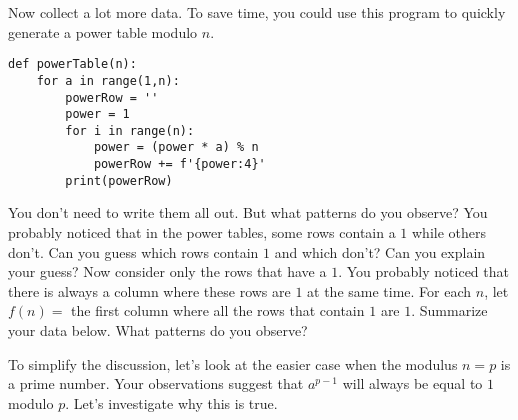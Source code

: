 \documentclass[12pt]{exam}
\newcommand{\Z}{\mathbb Z}
\begin{document}
\begin{questions}
\begin{center}
  \end{center}
  \newpage
  \question Now collect a lot more data. To save time, you could use this program to quickly generate a power table modulo $n$.
  \begin{lstlisting}
def powerTable(n):
    for a in range(1,n):
        powerRow = ''
        power = 1
        for i in range(n):
            power = (power * a) % n
            powerRow += f'{power:4}'
        print(powerRow)
  \end{lstlisting}
  You don't need to write them all out. But what patterns do you observe?
  \newpage
  \question You probably noticed that in the power tables, some rows contain a $1$ while others don't. Can you guess which rows contain $1$ and which don't? Can you explain your guess?
  \vspace{2in}
  \question Now consider only the rows that have a $1$. You probably noticed that there is always a column where these rows are $1$ at the same time. For each $n$, let $f(n)=$ the first column where all the rows that contain $1$ are $1$. Summarize your data below. What patterns do you observe?
  \begin{center}
  \end{center}
  \newpage
  \question To simplify the discussion, let's look at the easier case when the modulus $n=p$ is a prime number. Your observations suggest that $a^{p-1}$ will always be equal to $1$ modulo $p$. Let's investigate why this is true.
\end{questions}
\end{document}
